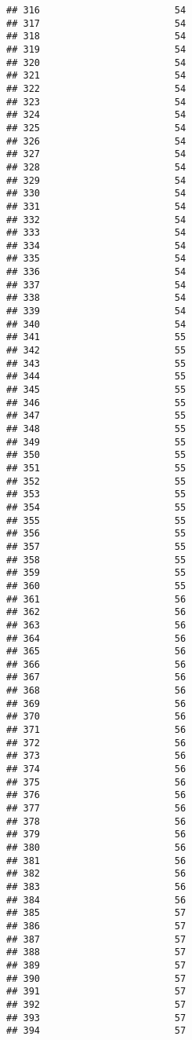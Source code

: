 \documentclass[
]{article}
\begin{document}
\begin{verbatim}
## 316                        54
## 317                        54
## 318                        54
## 319                        54
## 320                        54
## 321                        54
## 322                        54
## 323                        54
## 324                        54
## 325                        54
## 326                        54
## 327                        54
## 328                        54
## 329                        54
## 330                        54
## 331                        54
## 332                        54
## 333                        54
## 334                        54
## 335                        54
## 336                        54
## 337                        54
## 338                        54
## 339                        54
## 340                        54
## 341                        55
## 342                        55
## 343                        55
## 344                        55
## 345                        55
## 346                        55
## 347                        55
## 348                        55
## 349                        55
## 350                        55
## 351                        55
## 352                        55
## 353                        55
## 354                        55
## 355                        55
## 356                        55
## 357                        55
## 358                        55
## 359                        55
## 360                        55
## 361                        56
## 362                        56
## 363                        56
## 364                        56
## 365                        56
## 366                        56
## 367                        56
## 368                        56
## 369                        56
## 370                        56
## 371                        56
## 372                        56
## 373                        56
## 374                        56
## 375                        56
## 376                        56
## 377                        56
## 378                        56
## 379                        56
## 380                        56
## 381                        56
## 382                        56
## 383                        56
## 384                        56
## 385                        57
## 386                        57
## 387                        57
## 388                        57
## 389                        57
## 390                        57
## 391                        57
## 392                        57
## 393                        57
## 394                        57

\end{verbatim}
\end{document}
